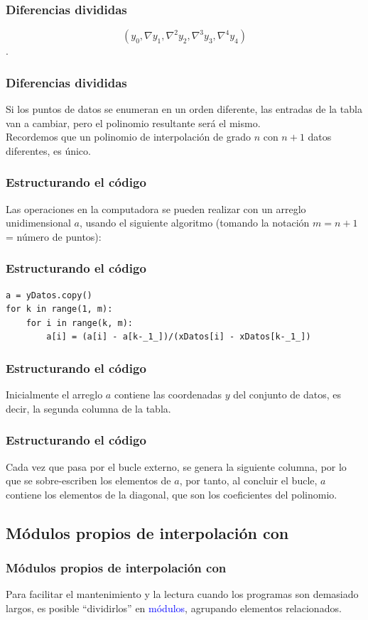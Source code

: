 \begin{frame}
\frametitle{Diferencias divididas}
\[ (y_{0}, \nabla y_{1}, \nabla^{2} y_{2}, \nabla^{3} y_{3}, \nabla^{4} y_{4}) \]
\pause
{}.
\end{frame}
\begin{frame}
\frametitle{Diferencias divididas}
Si los puntos de datos se enumeran en un orden diferente, las entradas de la tabla van a cambiar, pero el polinomio resultante será el mismo.
\\
\bigskip
Recordemos que un polinomio de interpolación de grado $n$ con $n + 1$ datos diferentes, es único.
\end{frame}
\begin{frame}[fragile]
\frametitle{Estructurando el código}
Las operaciones en la computadora se pueden realizar con un arreglo unidimensional $a$, usando el siguiente algoritmo (tomando la notación $m = n + 1$ = número de puntos):
\end{frame}
\begin{frame}[fragile]
\frametitle{Estructurando el código}
\begin{lstlisting}[caption=Calculando los coeficientes del polinomio, style=FormattedNumber, basicstyle=\linespread{1.1}\ttfamily=\small, columns=fullflexible]
a = yDatos.copy()
for k in range(1, m):
    for i in range(k, m):
        a[i] = (a[i] - a[k-_1_])/(xDatos[i] - xDatos[k-_1_])
\end{lstlisting}
\end{frame}
\begin{frame}
\frametitle{Estructurando el código}
Inicialmente el arreglo $a$ contiene las coordenadas $y$ del conjunto de datos, es decir, la segunda columna de la tabla.
\end{frame}
\begin{frame}
\frametitle{Estructurando el código}
Cada vez que pasa por el bucle externo, se genera la siguiente columna, por lo que se sobre-escriben los elementos de $a$, por tanto, al concluir el bucle, $a$ contiene los elementos de la diagonal, que son los coeficientes del polinomio.
\end{frame}
\subsection{Módulos propios de interpolación con \python}
\begin{frame}
\frametitle{Módulos propios de interpolación con \python}
Para facilitar el mantenimiento y la lectura cuando los programas son demasiado largos, es posible \enquote{dividirlos} en \textcolor{blue}{módulos}, agrupando elementos relacionados.
\end{frame}
